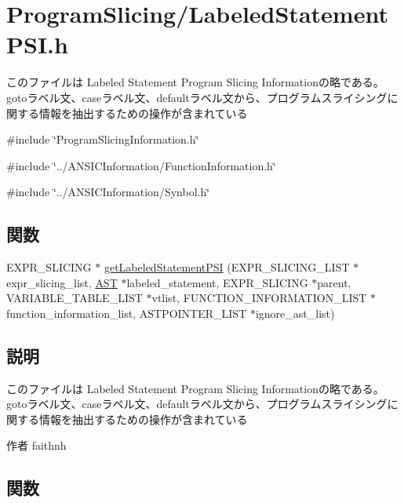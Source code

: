 \section{ProgramSlicing/LabeledStatementPSI.h}
\label{LabeledStatementPSI_8h}


このファイルは Labeled Statement Program Slicing Informationの略である。 gotoラベル文、caseラベル文、defaultラベル文から、プログラムスライシングに関する情報を抽出するための操作が含まれている  


{\ttfamily \#include \char`\"{}ProgramSlicingInformation.h\char`\"{}}\par
{\ttfamily \#include \char`\"{}../ANSICInformation/FunctionInformation.h\char`\"{}}\par
{\ttfamily \#include \char`\"{}../ANSICInformation/Synbol.h\char`\"{}}\par
\subsection*{関数}
\begin{DoxyCompactItemize}
\item 
EXPR\_\-SLICING $\ast$ \hyperlink{LabeledStatementPSI_8h_ae85b248acedfd5344483f8757a39aa7a}{getLabeledStatementPSI} (EXPR\_\-SLICING\_\-LIST $\ast$expr\_\-slicing\_\-list, \hyperlink{structabstract__syntax__tree}{AST} $\ast$labeled\_\-statement, EXPR\_\-SLICING $\ast$parent, VARIABLE\_\-TABLE\_\-LIST $\ast$vtlist, FUNCTION\_\-INFORMATION\_\-LIST $\ast$function\_\-information\_\-list, ASTPOINTER\_\-LIST $\ast$ignore\_\-ast\_\-list)
\end{DoxyCompactItemize}


\subsection{説明}
このファイルは Labeled Statement Program Slicing Informationの略である。 gotoラベル文、caseラベル文、defaultラベル文から、プログラムスライシングに関する情報を抽出するための操作が含まれている \begin{DoxyAuthor}{作者}
faithnh 
\end{DoxyAuthor}


\subsection{関数}
